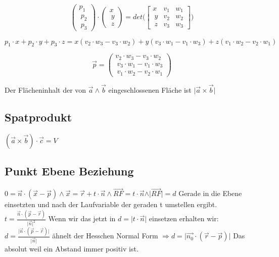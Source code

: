 \begin{equation}
	\begin{pmatrix}
		 p_1 \\\ p_2 \\\ p_3
	\end{pmatrix} \cdot \begin{pmatrix}
		 x \\\ y \\\ z
	\end{pmatrix} = det \Bigg( \begin{bmatrix}
		x & v_1 & w_1 \\\
		y & v_2 & w_2 \\\
		z & v_3 & w_3 
	\end{bmatrix} \Bigg)
\end{equation}

\begin{equation}
	p_1 \cdot x + p_2 \cdot y + p_3 \cdot z = x ( v_2 \cdot w_3 - v_3 \cdot w_2 ) + 
y ( v_3 \cdot w_1 - v_1 \cdot w_3 )
+ z (v_1 \cdot w_2 - v_2 \cdot w_1)
\end{equation}

\begin{equation}
\overrightarrow{p} = \begin{pmatrix}
v_2 \cdot w_3 - v_3 \cdot w_2 \\\
v_3 \cdot w_1 - v_1 \cdot w_3 \\\
v_1 \cdot w_2 - v_2 \cdot w_1
\end{pmatrix}
\end{equation}

Der Flächeninhalt der von \( \overrightarrow{a} \land  \overrightarrow{b} \) eingeschlossenen Fläche ist \( \vert \overrightarrow{a} \times \overrightarrow{b} \vert \)

\subsection*{ Spatprodukt }

\( (\overrightarrow{a} \times \overrightarrow{b}) \cdot \overrightarrow{c} = V \)

\subsection*{ Punkt Ebene Beziehung }

\( 0 = \overrightarrow{n} \cdot (\overrightarrow{x}- \overrightarrow{p}) \land \overrightarrow{x} = \overrightarrow{r} + t \cdot \overrightarrow{n}  \land \overrightarrow{RF} = t \cdot \overrightarrow{n} \land \vert \overrightarrow{RF} \vert = d \)
Gerade in die Ebene einsetzten und nach der Laufvariable der geraden t umstellen ergibt. \( t = \frac{ \overrightarrow{n} \cdot ( \overrightarrow{p} - \overrightarrow{r}) }{ \vert \overrightarrow{n} \vert ^2} \) Wenn wir das jetzt in \( d = \vert t \cdot \overrightarrow{n } \vert \) einsetzen erhalten wir: \( d = \frac{\vert \overrightarrow{n} \cdot ( \overrightarrow{p} - \overrightarrow{r} ) \vert }{\vert \overrightarrow{n} \vert } \) ähnelt der Hesschen Normal Form \( \Rightarrow d = \vert \overrightarrow{n_0} \cdot ( \overrightarrow{r} - \overrightarrow{p} ) \vert \) Das absolut weil ein Abstand immer positiv ist.

